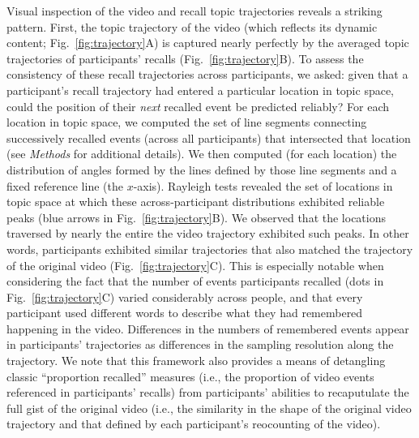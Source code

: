 \documentclass{article}
\begin{document}
Visual inspection of the video and recall topic trajectories reveals a striking pattern.  First, the topic trajectory of the video (which reflects its dynamic content; Fig.~\ref{fig:trajectory}A) is captured nearly perfectly by the averaged topic trajectories of participants' recalls (Fig.~\ref{fig:trajectory}B).  To assess the consistency of these recall trajectories across participants, we asked: given that a participant's recall trajectory had entered a particular location in topic space, could the position of their \textit{next} recalled event be predicted reliably?  For each location in topic space, we computed the set of line segments connecting successively recalled events (across all participants) that intersected that location (see \textit{Methods} for additional details).  We then computed (for each location) the distribution of angles formed by the lines defined by those line segments and a fixed reference line (the $x$-axis).  Rayleigh tests revealed the set of locations in topic space at which these across-participant distributions exhibited reliable peaks (blue arrows in Fig.~\ref{fig:trajectory}B).  We observed that the locations traversed by nearly the entire the video trajectory exhibited such peaks.  In other words, participants exhibited similar trajectories that also matched the trajectory of the original video (Fig.~\ref{fig:trajectory}C).  This is especially notable when considering the fact that the number of events participants recalled (dots in Fig.~\ref{fig:trajectory}C) varied considerably across people, and that every participant used different words to describe what they had remembered happening in the video.  Differences in the numbers of remembered events appear in participants' trajectories as differences in the sampling resolution along the trajectory.  We note that this framework also provides a means of detangling classic ``proportion recalled'' measures (i.e., the proportion of video events referenced in participants' recalls) from participants' abilities to recaputulate the full gist of the original video (i.e., the similarity in the shape of the original video trajectory and that defined by each participant's reocounting of the video).
\end{document}

